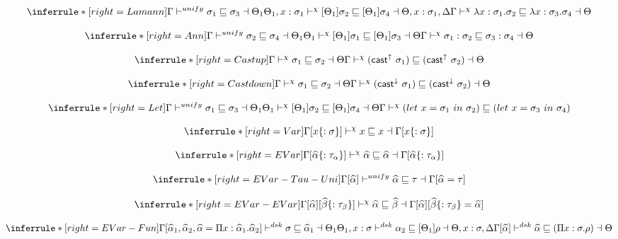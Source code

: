 \[
\inferrule*[right=Lamann]
{
\Gamma \unify \sigma_1 \sqsubseteq \sigma_3 \dashv \Theta_1 \\
\Theta_1, x:\sigma_1 \dskunify [\Theta_1]\sigma_2 \sqsubseteq [\Theta_1]\sigma_4 \dashv \Theta, x:\sigma_1, \Delta }
{\Gamma \dskunify \lambda x:\sigma_1. \sigma_2 \sqsubseteq \lambda x:\sigma_3. \sigma_4 \dashv \Theta
}
\]

\[
\inferrule*[right=Ann]
{
\Gamma \unify \sigma_2 \sqsubseteq \sigma_4 \dashv \Theta_1 \\
\Theta_1 \dskunify  [\Theta_1]\sigma_1 \sqsubseteq [\Theta_1]\sigma_3 \dashv \Theta }
{\Gamma \dskunify \sigma_1:\sigma_2 \sqsubseteq \sigma_3:\sigma_4 \dashv \Theta}
\]

\[
\inferrule*[right=Castup]
{
\Gamma \dskunify  \sigma_1 \sqsubseteq \sigma_2 \dashv \Theta}
{\Gamma \dskunify (\castupe \sigma_1) \sqsubseteq  (\castupe \sigma_2) \dashv \Theta}
\]

\[
\inferrule*[right=Castdown]
{
\Gamma \dskunify  \sigma_1 \sqsubseteq \sigma_2 \dashv \Theta}
{\Gamma \dskunify  (\castdowne \sigma_1) \sqsubseteq  (\castdowne \sigma_2) \dashv \Theta}
\]

\[
\inferrule*[right=Let]
{
\Gamma \unify \sigma_1 \sqsubseteq \sigma_3 \dashv \Theta_1 \\
\Theta_1 \dskunify  [\Theta_1]\sigma_2 \sqsubseteq [\Theta_1]\sigma_4 \dashv \Theta }
{\Gamma \dskunify  (let\ x = \sigma_1\ in\ \sigma_2) \sqsubseteq  (let\ x = \sigma_3\ in\ \sigma_4) }
\]

\[
\inferrule*[right=Var]
{ }
{\Gamma[x\{:\sigma\}] \dskunify x \sqsubseteq x \dashv \Gamma[x\{:\sigma\}] }
\]

\[
\inferrule*[right=EVar]
{ }
{\Gamma[\widehat \alpha\{:\tau_\alpha\} ] \dskunify \widehat \alpha \sqsubseteq \widehat \alpha \dashv \Gamma[\widehat \alpha\{:\tau_\alpha\}] }
\]



\[
\inferrule*[right=EVar-Tau-Uni]
{ }
{\Gamma[\widehat \alpha ] \unify \widehat \alpha \sqsubseteq \tau \dashv \Gamma[\widehat \alpha=\tau]}
\]

\[
\inferrule*[right=EVar-EVar]
{ }
{\Gamma[\widehat \alpha][\widehat \beta\{:\tau_\beta\}] \dskunify \widehat \alpha \sqsubseteq \widehat \beta \dashv
\Gamma[\widehat \alpha][\widehat \beta\{:\tau_\beta\} = \widehat \alpha] }
\]

\[
\inferrule*[right=EVar-Fun]
{\Gamma[\widehat \alpha_1, \widehat \alpha_2, \widehat \alpha = \Pi x: \widehat \alpha_1. \widehat \alpha_2]
    \dsk  \sigma \sqsubseteq \widehat \alpha_1 \dashv \Theta_1 \\
\Theta_1, x: \sigma \dsk \alpha_2 \sqsubseteq [\Theta_1] \rho \dashv \Theta, x:\sigma, \Delta}
{\Gamma[\widehat \alpha] \dsk \widehat \alpha \sqsubseteq (\Pi x:\sigma. \rho) \dashv \Theta}
\]

